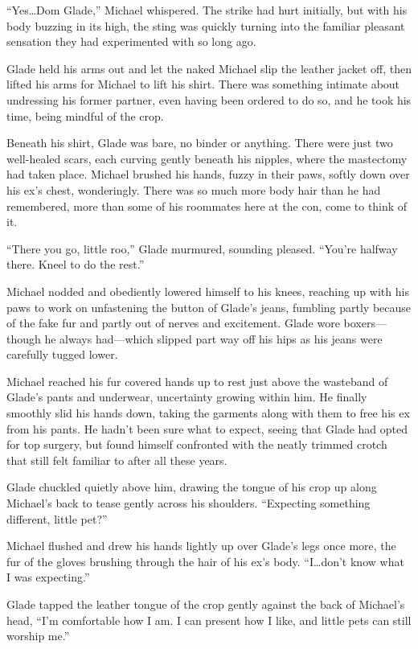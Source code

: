 ``Yes\ldots{}Dom Glade,'' Michael whispered. The strike had hurt initially, but with his body buzzing in its high, the sting was quickly turning into the familiar pleasant sensation they had experimented with so long ago.

Glade held his arms out and let the naked Michael slip the leather jacket off, then lifted his arms for Michael to lift his shirt. There was something intimate about undressing his former partner, even having been ordered to do so, and he took his time, being mindful of the crop.

Beneath his shirt, Glade was bare, no binder or anything. There were just two well-healed scars, each curving gently beneath his nipples, where the mastectomy had taken place. Michael brushed his hands, fuzzy in their paws, softly down over his ex's chest, wonderingly. There was so much more body hair than he had remembered, more than some of his roommates here at the con, come to think of it.

``There you go, little roo,'' Glade murmured, sounding pleased. ``You're halfway there. Kneel to do the rest.''

Michael nodded and obediently lowered himself to his knees, reaching up with his paws to work on unfastening the button of Glade's jeans, fumbling partly because of the fake fur and partly out of nerves and excitement. Glade wore boxers---though he always had---which slipped part way off his hips as his jeans were carefully tugged lower.

Michael reached his fur covered hands up to rest just above the wasteband of Glade's pants and underwear, uncertainty growing within him. He finally smoothly slid his hands down, taking the garments along with them to free his ex from his pants. He hadn't been sure what to expect, seeing that Glade had opted for top surgery, but found himself confronted with the neatly trimmed crotch that still felt familiar to after all these years.

Glade chuckled quietly above him, drawing the tongue of his crop up along Michael's back to tease gently across his shoulders. ``Expecting something different, little pet?''

Michael flushed and drew his hands lightly up over Glade's legs once more, the fur of the gloves brushing through the hair of his ex's body. ``I\ldots{}don't know what I was expecting.''

Glade tapped the leather tongue of the crop gently against the back of Michael's head, ``I'm comfortable how I am. I can present how I like, and little pets can still worship me.''

